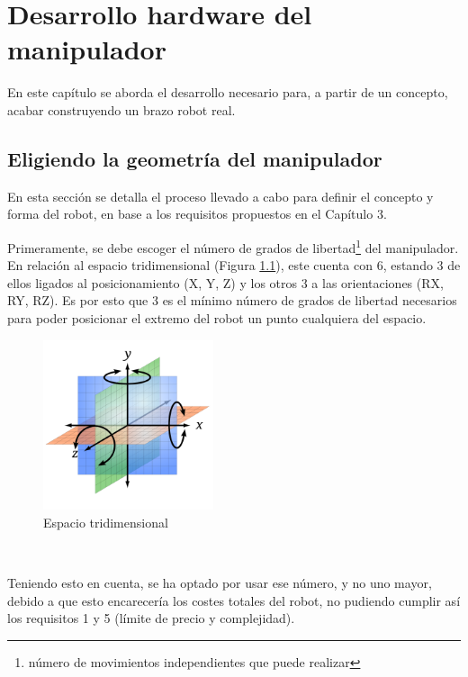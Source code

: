 \chapter{Desarrollo hardware del manipulador}
\label{cap:capitulo5}

\vspace{1cm}

\noindent En este capítulo se aborda el desarrollo necesario para, a partir de un concepto, acabar construyendo un brazo robot real. 
\section{Eligiendo la geometría del manipulador}
\label{sec:eligiendo_geometría}
\noindent En esta sección se detalla el proceso llevado a cabo para definir el concepto y forma del robot, en base a 
los requisitos propuestos en el Capítulo 3. 

Primeramente, se debe escoger el número de grados de libertad\footnote{número de movimientos independientes que puede realizar} del manipulador. 
En relación al espacio tridimensional (Figura \ref{fig:espacio_tridimensional}), este cuenta con 6, estando 3 de ellos ligados al 
posicionamiento (X, Y, Z) y los otros 3 a las orientaciones (RX, RY, RZ). Es por esto que 3 es el mínimo número de grados de libertad necesarios 
para poder posicionar el extremo del robot un punto cualquiera del espacio.

\begin{figure} [ht!]
  \begin{center}
    \includegraphics[width=5cm]{figs/coordinates.png}
  \end{center}
  \caption{Espacio tridimensional}
  \label{fig:espacio_tridimensional}
\end{figure}\ 

Teniendo esto en cuenta, se ha optado por usar ese número, y no uno mayor, debido a que esto encarecería los costes totales del robot, no pudiendo cumplir así 
los requisitos 1 y 5 (límite de precio y complejidad). 

